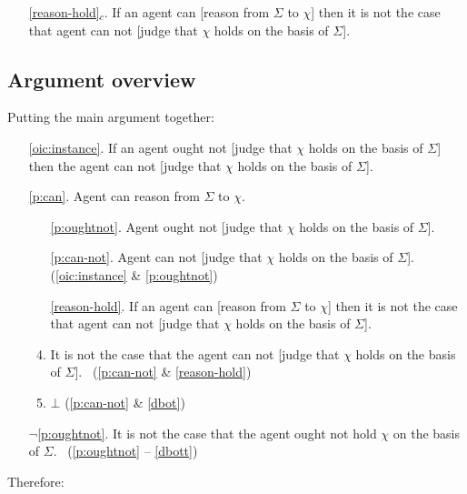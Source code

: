 \documentclass[10pt]{article}
\newcommand{\hozlinedash}[0]{%
  \noindent\hdashrule[0.5ex][c]{\textwidth}{.1pt}{2.5pt}
}
\begin{document}
\begin{itemize}
\item[\ref{reason-hold}\(_{c}\).] If an agent can [reason from \(\Sigma\) to \(\chi\)] then it is not the case that agent can not [judge that \(\chi\) holds on the basis of \(\Sigma\)].
\end{itemize}

\hozlinedash

\newpage

\subsection{Argument overview}
\label{sec:argument-overview}

Putting the main argument together:

\begin{enumerate}
\item[\ref{oic:instance}.] If an agent ought not [judge that \(\chi\) holds on the basis of \(\Sigma\)] then the agent can not [judge that \(\chi\) holds on the basis of \(\Sigma\)].
\item[\ref{p:can}.] Agent can reason from \(\Sigma\) to \(\chi\).
  \begin{enumerate}[ref=\alph*.]
  \item[\ref{p:oughtnot}.] Agent ought not [judge that \(\chi\) holds on the basis of \(\Sigma\)].
  \item[\ref{p:can-not}.] Agent can not [judge that \(\chi\) holds on the basis of \(\Sigma\)]. \hfill (\ref{oic:instance} \& \ref{p:oughtnot})
  \item[\ref{reason-hold}.] If an agent can [reason from \(\Sigma\) to \(\chi\)] then it is not the case that agent can not [judge that \(\chi\) holds on the basis of \(\Sigma\)].
  \item\label{dbot} It is not the case that the agent can not [judge that \(\chi\) holds on the basis of \(\Sigma\)].
  \mbox{ }\hfill (\ref{p:can-not} \& \ref{reason-hold})
  \item\label{dbott} \(\bot\) \hfill (\ref{p:can-not} \& \ref{dbot})
  \end{enumerate}
\item[\(\lnot\)\ref{p:oughtnot}.] It is not the case that the agent ought not hold \(\chi\) on the basis of \(\Sigma\).\linebreak
  \mbox{ }\hfill (\ref{p:oughtnot} -- \ref{dbott})
\end{enumerate}

Therefore:
\end{document}
